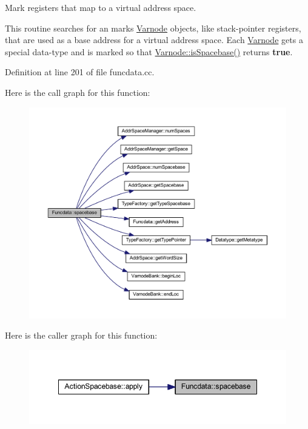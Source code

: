 Mark registers that map to a virtual address space. 

This routine searches for an marks \mbox{\hyperlink{class_varnode}{Varnode}} objects, like stack-\/pointer registers, that are used as a base address for a virtual address space. Each \mbox{\hyperlink{class_varnode}{Varnode}} gets a special data-\/type and is marked so that \mbox{\hyperlink{class_varnode_acd05a4490f361d118129cc0490072420}{Varnode\+::is\+Spacebase()}} returns {\bfseries{true}}. 

Definition at line 201 of file funcdata.\+cc.

Here is the call graph for this function\+:
\nopagebreak
\begin{figure}[H]
\begin{center}
\leavevmode
\includegraphics[width=350pt]{class_funcdata_a96433773ee0126ce9a25b0970a6ef513_cgraph}
\end{center}
\end{figure}
Here is the caller graph for this function\+:
\nopagebreak
\begin{figure}[H]
\begin{center}
\leavevmode
\includegraphics[width=348pt]{class_funcdata_a96433773ee0126ce9a25b0970a6ef513_icgraph}
\end{center}
\end{figure}
\mbox{\label{class_funcdata_aaf4a89f4e3da37a4107992689f7b89ff}} 
